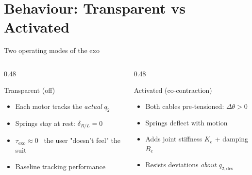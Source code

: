 \documentclass[10pt,aspectratio=169]{beamer}
\newcommand{\tauexo}{\tau_\mathrm{exo}}
\newcommand{\Ke}{K_e}
\newcommand{\Be}{B_e}
\newcommand{\dth}{\Delta\theta}
\newcommand{\checkitem}{\textcolor{drakegreen}{\ding{51}}~}
\begin{document}
\section{Behaviour: Transparent vs Activated}

\begin{frame}{Two operating modes of the exo}
\begin{columns}[T,onlytextwidth]
\begin{column}{0.48\textwidth}
\begin{block}{Transparent (off)}
\begin{itemize}
    \item Each motor tracks the \emph{actual} $q_2$
    \item Springs stay at rest: $\delta_{R/L}\!=\!0$
    \item $\tauexo \approx 0$ \checkitem the user "doesn't feel" the suit
    \item Baseline tracking performance
\end{itemize}
\end{block}
\end{column}
\begin{column}{0.48\textwidth}
\begin{block}{Activated (co-contraction)}
\begin{itemize}
    \item Both cables pre-tensioned: $\dth>0$
    \item Springs deflect with motion
    \item Adds joint stiffness $\Ke$ + damping $\Be$
    \item Resists deviations \emph{about $q_{2,\mathrm{des}}$}
\end{itemize}
\end{block}
\end{column}
\end{columns}

\vspace{0.4cm}
\begin{center}
\end{center}
\end{frame}
\end{document}
